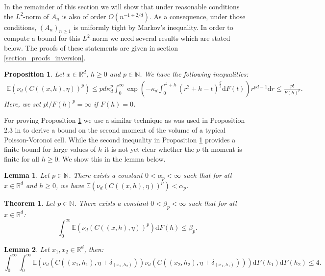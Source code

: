 \documentclass{article}
\newcommand{\NN}{\mathbb{N}}
\newcommand{\RR}{\mathbb{R}}
\newcommand{\EE}{\mathbb{E}}
\theoremstyle{plain}
\newtheorem{theorem}{Theorem}
\newtheorem{lemma}{Lemma}
\newtheorem{proposition}{Proposition}
\theoremstyle{remark}
\theoremstyle{definition}
\begin{document}
In the remainder of this section we will show that under reasonable conditions the $L^2$-norm of $A_n$ is also of order $O(n^{-1+2/d})$. As a consequence, under those conditions, $(A_n)_{n\geq 1}$ is uniformly tight by Markov's inequality. In order to compute a bound for this $L^2$-norm we need several results which are stated below. The proofs of these statements are given in section \ref{section_proofs_inversion}.

\begin{proposition}\label{prop_second_moment_bound}
    Let $x \in \RR^d$, $h \geq 0$ and $p \in \NN$. We have the following inequalities:
    \begin{align*}
        \EE\left(\nu_d(C((x,h),\eta))^p\right) \leq pd\kappa_d^p\int_0^\infty \exp\left(-\kappa_d\int_0^{r^2 + h}\left(r^2 + h -t \right)^\frac{d}{2}\mathrm{d}F(t)\right)r^{pd-1}\mathrm{d}r \leq \frac{p!}{F(h)^p}.
    \end{align*}
    Here, we set $p!/F(h)^p = \infty$ if $F(h) = 0$.
\end{proposition}

For proving Proposition \ref{prop_second_moment_bound} we use a similar technique as was used in Proposition 2.3 in \cite{Olsbo2007} to derive a bound on the second moment of the volume of a typical Poisson-Voronoi cell. While the second inequality in Proposition \ref{prop_second_moment_bound} provides a finite bound for large values of $h$ it is not yet clear whether the $p$-th moment is finite for all $h \geq 0$. We show this in the lemma below.

\begin{lemma}\label{lemma_individual_second_moment_finite}
    Let $p \in \NN$. There exists a constant $ 0 < \alpha_p< \infty$ such that for all $x \in \RR^d$ and $h \geq 0$, we have $\EE\left(\nu_d(C((x,h),\eta))^p\right) < \alpha_p$.
\end{lemma}

\begin{theorem}\label{thm_integrated_second_moment}
    Let $p \in \NN$. There exists a constant $0 < \beta_p < \infty$ such that for all $x \in \RR^d$:
    \[\int_0^\infty \EE\left(\nu_d(C((x,h),\eta))^p\right) \mathrm{d}F(h) \leq \beta_p.\]
\end{theorem}

\begin{lemma}\label{lemma_bound_product_cell_volumes}
    Let $x_1,x_2 \in \RR^d$, then:
    \[\int_0^\infty \int_0^\infty \EE\left(\nu_d(C((x_1,h_1),\eta+\delta_{(x_2,h_2)}))\nu_d(C((x_2,h_2),\eta+\delta_{(x_1,h_1)})) \right)\mathrm{d}F(h_1)\mathrm{d}F(h_2) \leq 4.\]
\end{lemma}
\end{document}
